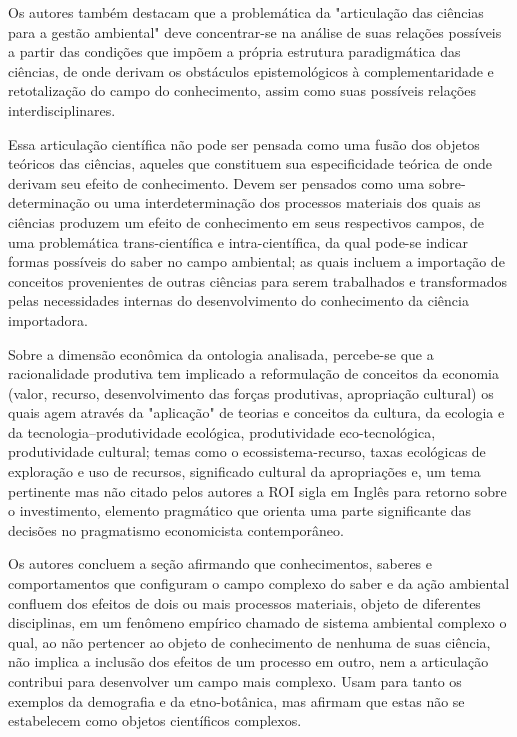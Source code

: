 \documentclass[
   article,       %
   12pt,          %
   oneside,       %
   a4paper,       %
   english,       %
   brazil,           %
   sumario=tradicional
   ]{abntex2}
\begin{document}
Os autores também destacam que a problemática da "articulação das ciências para a gestão ambiental" deve concentrar-se na análise de suas relações possíveis a partir das condições que impõem a própria estrutura paradigmática das ciências, de onde derivam os obstáculos epistemológicos à complementaridade e retotalização do campo do conhecimento, assim como suas possíveis relações interdisciplinares. 

Essa articulação científica não pode ser pensada como uma fusão dos objetos teóricos das ciências, aqueles que constituem sua especificidade teórica de onde derivam seu efeito de conhecimento. Devem ser pensados como uma sobre-determinação ou uma interdeterminação dos processos materiais dos quais as ciências produzem um efeito de conhecimento em seus respectivos campos, de uma problemática trans-científica e intra-científica, da qual pode-se indicar  formas possíveis do saber no campo ambiental; as quais incluem a importação de conceitos provenientes de outras ciências para serem trabalhados e transformados pelas necessidades internas do desenvolvimento do conhecimento da ciência importadora.

Sobre a dimensão econômica da ontologia analisada, percebe-se que a racionalidade produtiva tem implicado a reformulação de conceitos da economia (valor, recurso, desenvolvimento das forças produtivas, apropriação cultural) os quais agem através da "aplicação" de teorias e conceitos da cultura, da ecologia e da tecnologia–produtividade ecológica, produtividade eco-tecnológica, produtividade cultural; temas como o  ecossistema-recurso, taxas ecológicas de exploração e uso de recursos, significado cultural da apropriações e, um tema pertinente mas não citado pelos autores a ROI sigla em Inglês para retorno sobre o investimento, elemento pragmático que orienta uma parte significante das decisões no pragmatismo economicista contemporâneo.

Os autores concluem a seção afirmando que conhecimentos, saberes e comportamentos que configuram o campo complexo do saber e da ação ambiental  confluem dos efeitos de dois ou mais processos materiais, objeto de diferentes disciplinas, em um fenômeno empírico chamado de sistema ambiental complexo o qual, ao não pertencer ao objeto de conhecimento de nenhuma de suas ciência, não implica a inclusão dos efeitos de um processo em outro, nem a articulação contribui para desenvolver um campo mais complexo. Usam para tanto os exemplos da demografia e da etno-botânica, mas afirmam que estas não se estabelecem como objetos científicos complexos. 
\end{document}
